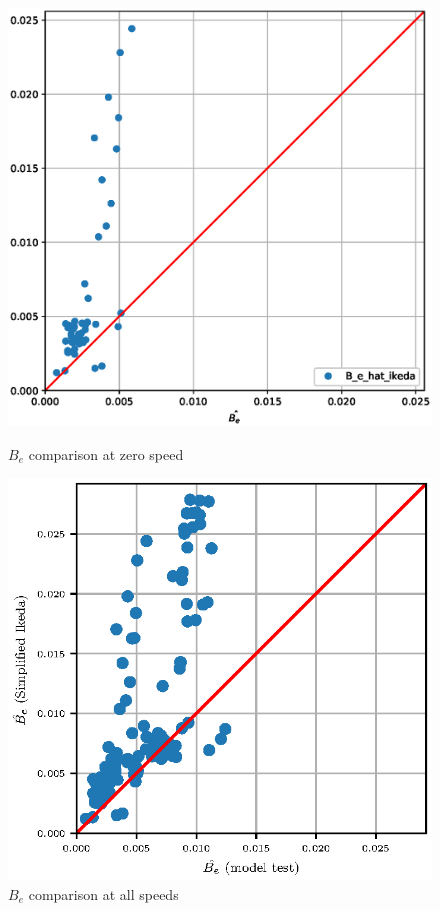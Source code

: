 \begin{figure}[H]
\centering
\begin{minipage}{.5\textwidth}
  \centering
  \includegraphics[width=1.0\columnwidth]{figures/B_e_hat_ikeda_zero.eps}
  \caption{$\hat{B_e}$ comparison at zero speed}
  \label{fig:B_e_hat_ikeda_zero}
\end{minipage}%
\begin{minipage}{.5\textwidth}
  \centering
  \includegraphics[width=1.0\columnwidth]{figures/B_e_hat_ikeda.eps}
  \caption{$\hat{B_e}$ comparison at all speeds}
  \label{fig:B_e_hat_ikeda}
\end{minipage}
\end{figure}


